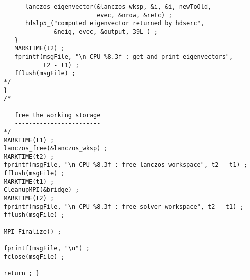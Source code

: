 \begin{verbatim}
      lanczos_eigenvector(&lanczos_wksp, &i, &i, newToOld,
                          evec, &nrow, &retc) ;
      hdslp5_("computed eigenvector returned by hdserc",
              &neig, evec, &output, 39L ) ;
   }
   MARKTIME(t2) ;
   fprintf(msgFile, "\n CPU %8.3f : get and print eigenvectors", 
           t2 - t1) ;
   fflush(msgFile) ;
*/
}
/*
   ------------------------
   free the working storage
   ------------------------
*/
MARKTIME(t1) ;
lanczos_free(&lanczos_wksp) ;
MARKTIME(t2) ;
fprintf(msgFile, "\n CPU %8.3f : free lanczos workspace", t2 - t1) ;
fflush(msgFile) ;
MARKTIME(t1) ;
CleanupMPI(&bridge) ;
MARKTIME(t2) ;
fprintf(msgFile, "\n CPU %8.3f : free solver workspace", t2 - t1) ;
fflush(msgFile) ;

MPI_Finalize() ;

fprintf(msgFile, "\n") ;
fclose(msgFile) ;

return ; }

\end{verbatim}
